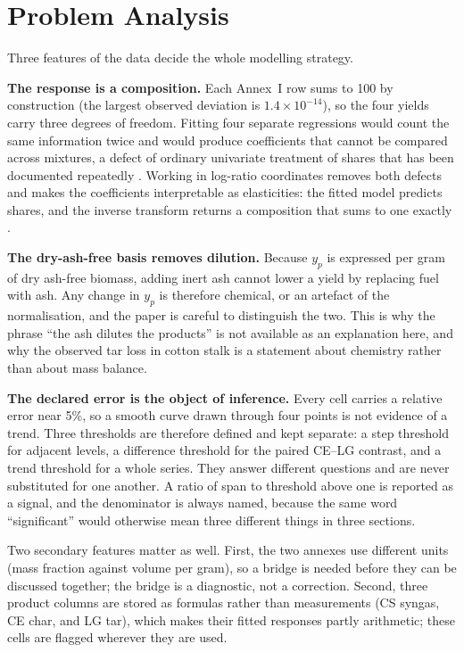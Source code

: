 \documentclass[withoutpreface,bwprint]{apmcmthesis}
\begin{document}
\section{Problem Analysis}
Three features of the data decide the whole modelling strategy.

\textbf{The response is a composition.} Each Annex~I row sums to 100 by construction (the largest observed deviation is $1.4\times10^{-14}$), so the four yields carry three degrees of freedom. Fitting four separate regressions would count the same information twice and would produce coefficients that cannot be compared across mixtures, a defect of ordinary univariate treatment of shares that has been documented repeatedly \cite{Aitchison1982,Filzmoser2009}. Working in log-ratio coordinates removes both defects and makes the coefficients interpretable as elasticities: the fitted model predicts shares, and the inverse transform returns a composition that sums to one exactly \cite{Egozcue2003,Pawlowsky2011}.

\textbf{The dry-ash-free basis removes dilution.} Because $y_p$ is expressed per gram of dry ash-free biomass, adding inert ash cannot lower a yield by replacing fuel with ash. Any change in $y_p$ is therefore chemical, or an artefact of the normalisation, and the paper is careful to distinguish the two. This is why the phrase ``the ash dilutes the products'' is not available as an explanation here, and why the observed tar loss in cotton stalk is a statement about chemistry rather than about mass balance.

\textbf{The declared error is the object of inference.} Every cell carries a relative error near 5\%, so a smooth curve drawn through four points is not evidence of a trend. Three thresholds are therefore defined and kept separate: a step threshold for adjacent levels, a difference threshold for the paired CE--LG contrast, and a trend threshold for a whole series. They answer different questions and are never substituted for one another. A ratio of span to threshold above one is reported as a signal, and the denominator is always named, because the same word ``significant'' would otherwise mean three different things in three sections.

Two secondary features matter as well. First, the two annexes use different units (mass fraction against volume per gram), so a bridge is needed before they can be discussed together; the bridge is a diagnostic, not a correction. Second, three product columns are stored as formulas rather than measurements (CS syngas, CE char, and LG tar), which makes their fitted responses partly arithmetic; these cells are flagged wherever they are used.
\end{document}
